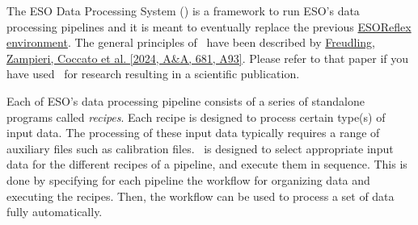 The ESO Data Processing System (\edps) is a framework to run ESO’s
data processing pipelines and it is meant to eventually replace the
previous \href{https://www.eso.org/sci/software/esoreflex/}{ESOReflex
  environment}. The general principles of \edps\ have been described by
\href{https://www.aanda.org/articles/aa/full_html/2024/01/aa47651-23/aa47651-23.html}{Freudling,
  Zampieri, Coccato et al. [2024, A\&A, 681, A93]}. Please refer to
that paper if you have used \edps\ for research resulting in a
scientific publication.

Each of ESO’s data processing pipeline consists of a series of
standalone programs called {\it recipes}. Each recipe is designed to
process certain type(s) of input data. The processing of these input
data typically requires a range of auxiliary files such as calibration
files. \edps\ is designed to select appropriate input data for the
different recipes of a pipeline, and execute them in sequence. This is
done by specifying for each pipeline the workflow for organizing data
and executing the recipes. Then, the workflow can be used to process a set
of data fully automatically.
